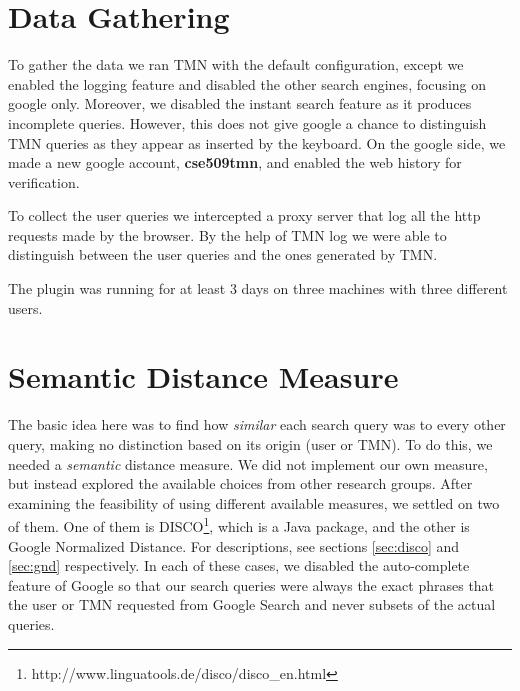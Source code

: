 \documentclass[11pt]{article}
\begin{document}
\begin{multicols}{2}
\section{Data Gathering}
To gather the data we ran TMN with the default configuration, except we enabled the logging feature and disabled the other search engines, focusing on google only. Moreover, we disabled the instant search feature as it produces incomplete queries. However, this does not give google a chance to distinguish TMN queries as they appear as inserted by the keyboard. On the google side, we made a new google account, \textbf{cse509tmn}, and enabled the web history for verification.

To collect the user queries we intercepted a proxy server that log all the http requests made by the browser. By the help of TMN log we were able to distinguish between the user queries and the ones generated by TMN.

The plugin was running for at least 3 days on three machines with three different users.

\section{Semantic Distance Measure}
The basic idea here was to find how \textit{similar} each search query was to every other query, making no distinction based on its origin (user or TMN). To do this, we needed a \textit{semantic} distance measure. We did not implement our own measure, but instead explored the available choices from other research groups. After examining the feasibility of using different available measures, we settled on two of them. One of them is DISCO\footnote{http://www.linguatools.de/disco/disco\_en.html}, which is a Java package, and the other is Google Normalized Distance. For descriptions, see sections \ref{sec:disco} and \ref{sec:gnd} respectively. In each of these cases, we disabled the auto-complete feature of Google so that our search queries were always the exact phrases that the user or TMN requested from Google Search and never subsets of the actual queries.


\end{multicols}
\end{document}
